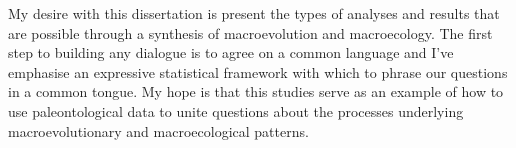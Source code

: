 \documentclass[12pt,letterpaper]{article}
\begin{document}
My desire with this dissertation is present the types of analyses and results that are possible through a synthesis of macroevolution and macroecology. The first step to building any dialogue is to agree on a common language and I've emphasise an expressive statistical framework with which to phrase our questions in a common tongue. My hope is that this studies serve as an example of how to use paleontological data to unite questions about the processes underlying macroevolutionary and macroecological patterns.
\end{document}
